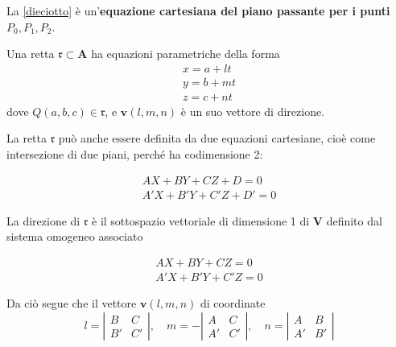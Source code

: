 \documentclass{article}
\theoremstyle{plain}
\theoremstyle{definition}
\theoremstyle{remark}
\begin{document}
La \ref{dieciotto} è un'\textbf{equazione cartesiana del piano passante per i punti} \( P_0, P_1, P_2 \).

Una retta \( \mathfrak{r} \subset \mathbf{A} \) ha equazioni parametriche della forma
\begin{equation}\label{diecinove}
\begin{matrix}
x = a + lt \\
y = b + mt \\
z = c + nt
\end{matrix}
\end{equation}
dove \( Q(a, b, c) \in \mathfrak{r} \), e \( \mathbf{v}(l, m, n) \) è un suo vettore di direzione. 

\vspace{10pt}

La retta \( \mathfrak{r} \) può anche essere definita da due equazioni cartesiane, cioè come intersezione di due piani, perché ha codimensione 2:

\begin{equation}\label{diecidieci}
\begin{matrix}
AX + BY + CZ + D = 0 \\
A'X + B'Y + C'Z + D' = 0
\end{matrix}
\end{equation}

La direzione di \( \mathfrak{r} \) è il sottospazio vettoriale di dimensione 1 di \( \mathbf{V} \) definito dal sistema omogeneo associato

\begin{equation}\label{dieciundici}
\begin{matrix}
AX + BY + CZ = 0 \\
A'X + B'Y + C'Z = 0
\end{matrix}
\end{equation}

Da ciò segue che il vettore \( \mathbf{v}(l, m, n) \) di coordinate
\[
l =
\left|
\begin{array}{cc}
B & C \\
B' & C'
\end{array}
\right|,
\quad
m = -
\left|
\begin{array}{cc}
A & C \\
A' & C'
\end{array}
\right|,
\quad
n =
\left|
\begin{array}{cc}
A & B \\
A' & B'
\end{array}
\right|
\]
\end{document}
